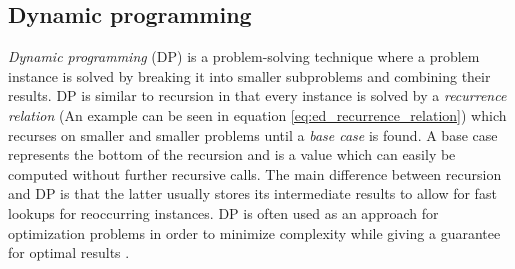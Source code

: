 \documentclass[thesis.tex]{subfiles}
\begin{document}
\subsection{Dynamic programming}
\label{sec:dynamic_programming}
\textit{Dynamic programming} (DP) is a problem-solving technique where a problem instance is solved by breaking it into smaller subproblems and combining their results. DP is similar to recursion in that every instance is solved by a \textit{recurrence relation} (An example can be seen in equation \ref{eq:ed_recurrence_relation}) which recurses on smaller and smaller problems until a \textit{base case} is found. A base case represents the bottom of the recursion and is a value which can easily be computed without further recursive calls. The main difference between recursion and DP is that the latter usually stores its intermediate results to allow for fast lookups for reoccurring instances. DP is often used as an approach for optimization problems in order to minimize complexity while giving a guarantee for optimal results \cite[Chapter 9]{algorithms_sequential_parallell_and_distributed}.
\end{document}
